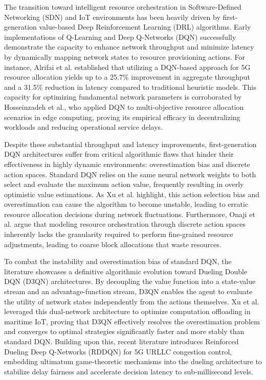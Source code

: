 The transition toward intelligent resource orchestration in Software-Defined Networking (SDN) and IoT environments has been heavily driven by first-generation value-based Deep Reinforcement Learning (DRL) algorithms. Early implementations of Q-Learning and Deep Q-Networks (DQN) successfully demonstrate the capacity to enhance network throughput and minimize latency by dynamically mapping network states to resource provisioning actions. For instance, Alrifai et al. established that utilizing a DQN-based approach for 5G resource allocation yields up to a 25.7\% improvement in aggregate throughput and a 31.5\% reduction in latency compared to traditional heuristic models\cite{b14}. This capacity for optimizing fundamental network parameters is corroborated by Hosseinzadeh et al., who applied DQN to multi-objective resource allocation scenarios in edge computing, proving its empirical efficacy in decentralizing workloads and reducing operational service delays\cite{b15}.

Despite these substantial throughput and latency improvements, first-generation DQN architectures suffer from critical algorithmic flaws that hinder their effectiveness in highly dynamic environments: overestimation bias and discrete action spaces. Standard DQN relies on the same neural network weights to both select and evaluate the maximum action value, frequently resulting in overly optimistic value estimations. As Xu et al. highlight, this action selection bias and overestimation can cause the algorithm to become unstable, leading to erratic resource allocation decisions during network fluctuations\cite{b13}. Furthermore, Onaji et al. argue that modeling resource orchestration through discrete action spaces inherently lacks the granularity required to perform fine-grained resource adjustments, leading to coarse block allocations that waste resources\cite{b6}.

To combat the instability and overestimation bias of standard DQN, the literature showcases a definitive algorithmic evolution toward Dueling Double DQN (D3QN) architectures. By decoupling the value function into a state-value stream and an advantage-function stream, D3QN enables the agent to evaluate the utility of network states independently from the actions themselves. Xu et al. leveraged this dual-network architecture to optimize computation offloading in maritime IoT, proving that D3QN effectively resolves the overestimation problem and converges to optimal strategies significantly faster and more stably than standard DQN\cite{b13}. Building upon this, recent literature introduces Reinforced Dueling Deep Q-Networks (RDDQN) for 5G URLLC congestion control, embedding ultimatum game-theoretic mechanisms into the dueling architecture to stabilize delay fairness and accelerate decision latency to sub-millisecond levels\cite{b16}.

